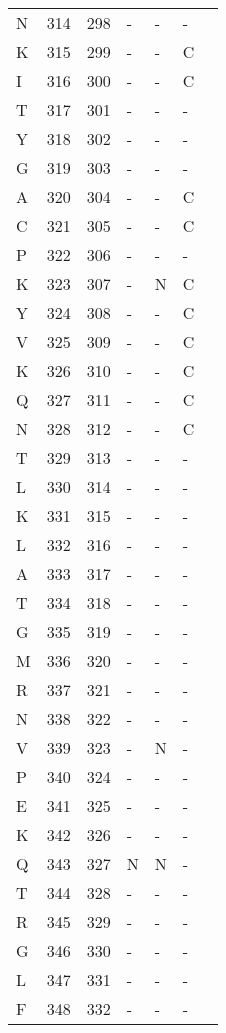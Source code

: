 \begin{longtable}{lllllll}
  N & 314 & 298 & - & - & - &  \\ 
  K & 315 & 299 & - & - & C &  \\ 
  I & 316 & 300 & - & - & C &  \\ 
  T & 317 & 301 & - & - & - &  \\ 
  Y & 318 & 302 & - & - & - &  \\ 
  G & 319 & 303 & - & - & - &  \\ 
  A & 320 & 304 & - & - & C &  \\ 
  C & 321 & 305 & - & - & C &  \\ 
  P & 322 & 306 & - & - & - &  \\ 
  K & 323 & 307 & - & N & C &  \\ 
  Y & 324 & 308 & - & - & C &  \\ 
  V & 325 & 309 & - & - & C &  \\ 
  K & 326 & 310 & - & - & C &  \\ 
  Q & 327 & 311 & - & - & C &  \\ 
  N & 328 & 312 & - & - & C &  \\ 
  T & 329 & 313 & - & - & - &  \\ 
  L & 330 & 314 & - & - & - &  \\ 
  K & 331 & 315 & - & - & - &  \\ 
  L & 332 & 316 & - & - & - &  \\ 
  A & 333 & 317 & - & - & - &  \\ 
  T & 334 & 318 & - & - & - &  \\ 
  G & 335 & 319 & - & - & - &  \\ 
  M & 336 & 320 & - & - & - &  \\ 
  R & 337 & 321 & - & - & - &  \\ 
  N & 338 & 322 & - & - & - &  \\ 
  V & 339 & 323 & - & N & - &  \\ 
  P & 340 & 324 & - & - & - &  \\ 
  E & 341 & 325 & - & - & - &  \\ 
  K & 342 & 326 & - & - & - &  \\ 
  Q & 343 & 327 & N & N & - &  \\ 
  T & 344 & 328 & - & - & - &  \\ 
  R & 345 & 329 & - & - & - &  \\ 
  G & 346 & 330 & - & - & - &  \\ 
  L & 347 & 331 & - & - & - &  \\ 
  F & 348 & 332 & - & - & - &  \\ 

\end{longtable}
